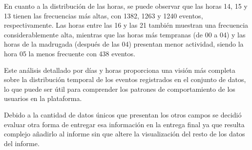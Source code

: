 En cuanto a la distribución de las horas, se puede observar que las horas 14, 15 y 13 tienen las frecuencias más altas, con 1382, 1263 y 1240 eventos, respectivamente. Las horas entre las 16 y las 21 también muestran una frecuencia considerablemente alta, mientras que las horas más tempranas (de 00 a 04) y las horas de la madrugada (después de las 04) presentan menor actividad, siendo la hora 05 la menos frecuente con 438 eventos.

Este análisis detallado por días y horas proporciona una visión más completa sobre la distribución temporal de los eventos registrados en el conjunto de datos, lo que puede ser útil para comprender los patrones de comportamiento de los usuarios en la plataforma.

Debido a la cantidad de datos únicos que presentan los otros campos se decidió evaluar otra forma de entregar esa información en la entrega final ya que resulta complejo añadirlo al informe sin que altere la visualización del resto de los datos del informe.